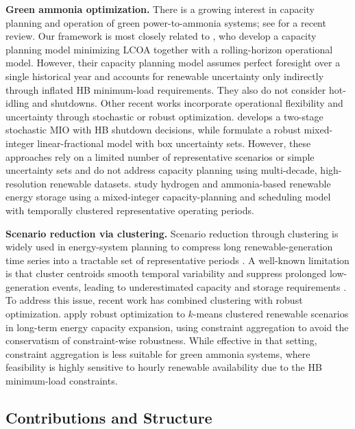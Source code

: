 \documentclass[11pt, letter]{article}
\begin{document}
\textbf{Green ammonia optimization.}
There is a growing interest in capacity planning and operation of green power-to-ammonia systems; see \citet{narciso_design_2025} for a recent review. Our framework is most closely related to \citet{salmon_impact_2023}, who develop a capacity planning model minimizing LCOA together with a rolling-horizon operational model. However, their capacity planning model assumes perfect foresight over a single historical year and accounts for renewable uncertainty only indirectly through inflated HB minimum-load requirements. They also do not consider hot-idling and shutdowns. Other recent works incorporate operational flexibility and uncertainty through stochastic or robust optimization. \citet{wang_optimal_2025} develops a two-stage stochastic MIO with HB shutdown decisions, while \citet{yu_optimal_2023} formulate a robust mixed-integer linear-fractional model with box uncertainty sets. However, these approaches rely on a limited number of representative scenarios or simple uncertainty sets and do not address capacity planning using multi-decade, high-resolution renewable datasets. \citet{palys_using_2020} study hydrogen and ammonia-based renewable energy storage using a mixed-integer capacity-planning and scheduling model with temporally clustered representative operating periods.

\textbf{Scenario reduction via clustering.}
Scenario reduction through clustering is widely used in energy-system planning to compress long renewable-generation time series into a tractable set of representative periods \citep{teichgraeber_time-series_2022}. A well-known limitation is that cluster centroids smooth temporal variability and suppress prolonged low-generation events, leading to underestimated capacity and storage requirements \citep{teichgraeber_clustering_2019}. To address this issue, recent work has combined clustering with robust optimization. \citet{bertsimas_decarbonizing_2023} apply robust optimization to $k$-means clustered renewable scenarios in long-term energy capacity expansion, using constraint aggregation to avoid the conservatism of constraint-wise robustness. 
While effective in that setting, constraint aggregation is less suitable for green ammonia systems, where feasibility is highly sensitive to hourly renewable availability due to the HB minimum-load constraints.

\subsection{Contributions and Structure}
\end{document}
